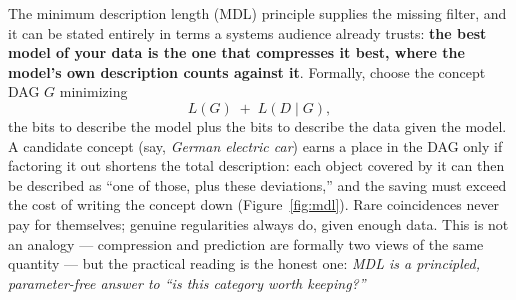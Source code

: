\documentclass[10pt,twocolumn]{article}
\begin{document}
The minimum description length (MDL) principle
\cite{rissanen1978,grunwald2007} supplies the missing filter, and it can
be stated entirely in terms a systems audience already trusts:
\textbf{the best model of your data is the one that compresses it best,
where the model's own description counts against it}. Formally, choose the
concept DAG $G$ minimizing
\[
  L(G) \;+\; L(D \mid G),
\]
the bits to describe the model plus the bits to describe the data given
the model. A candidate concept (say, \emph{German electric car}) earns a
place in the DAG only if factoring it out shortens the total description:
each object covered by it can then be described as ``one of those, plus
these deviations,'' and the saving must exceed the cost of writing the
concept down (Figure~\ref{fig:mdl}). Rare coincidences never pay for themselves; genuine
regularities always do, given enough data. This is not an analogy ---
compression and prediction are formally two views of the same quantity ---
but the practical reading is the honest one: \emph{MDL is a principled,
parameter-free answer to ``is this category worth keeping?''}
\end{document}
